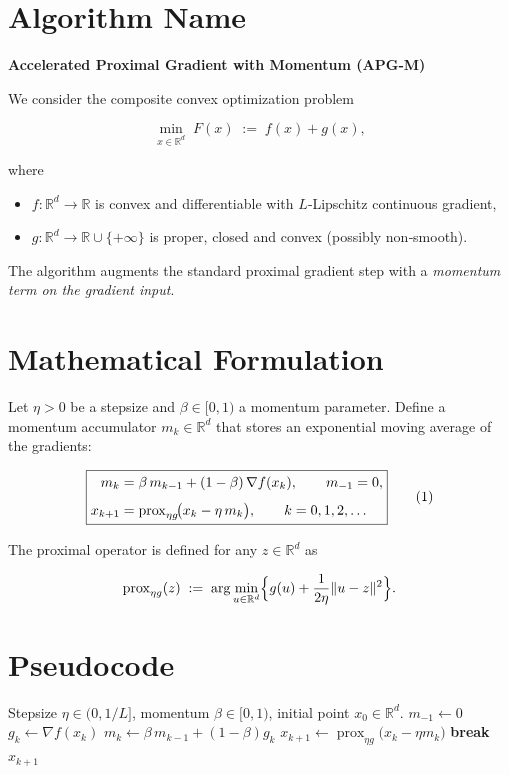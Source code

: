 \documentclass{article}
\newcommand{\prox}{\operatorname{prox}}
\newcommand{\R}{\mathbb{R}}
\begin{document}
\section*{Algorithm Name}
\textbf{Accelerated Proximal Gradient with Momentum (APG‑M)}  

We consider the composite convex optimization problem  

\[
\min_{x\in \R^{d}}\;F(x)\;:=\;f(x)+g(x),
\]

where  
\begin{itemize}
    \item $f:\R^{d}\rightarrow\R$ is convex and differentiable with $L$‑Lipschitz continuous gradient,
    \item $g:\R^{d}\rightarrow\R\cup\{+\infty\}$ is proper, closed and convex (possibly non‑smooth).
\end{itemize}
The algorithm augments the standard proximal gradient step with a \emph{momentum term on the gradient input}.

\section*{Mathematical Formulation}
Let $\eta>0$ be a stepsize and $\beta\in[0,1)$ a momentum parameter.  
Define a momentum accumulator $m_k\in\R^{d}$ that stores an exponential moving average of the gradients:

\[
\boxed{%
\begin{aligned}
m_{k} &= \beta\,m_{k-1} + (1-\beta)\,\nabla f(x_k),\qquad m_{-1}=0,\\[4pt]
x_{k+1} &= \prox_{\eta g}\!\bigl(x_k - \eta\,m_k\bigr),\qquad k=0,1,2,\dots
\end{aligned}}
\tag{1}
\]

The proximal operator is defined for any $z\in\R^{d}$ as  

\[
\prox_{\eta g}(z)\;:=\;\arg\min_{u\in\R^{d}}\Bigl\{ g(u)+\frac{1}{2\eta}\|u-z\|^{2}\Bigr\}.
\]

\section*{Pseudocode}
\begin{algorithm}[H]
\caption{APG‑M}
\begin{algorithmic}[1]
\Require Stepsize $\eta\in(0,1/L]$, momentum $\beta\in[0,1)$, initial point $x_{0}\in\R^{d}$.
\State $m_{-1}\gets 0$ 
    \State $g_{k}\gets \nabla f(x_{k})$ 
    \State $m_{k}\gets \beta\,m_{k-1}+(1-\beta)g_{k}$ 
    \State $x_{k+1}\gets \prox_{\eta g}\!\bigl(x_{k}-\eta m_{k}\bigr)$ 
        \State \textbf{break}
    \EndIf
\EndFor
\State \Return $x_{k+1}$
\end{algorithmic}
\end{algorithm}
\end{document}
